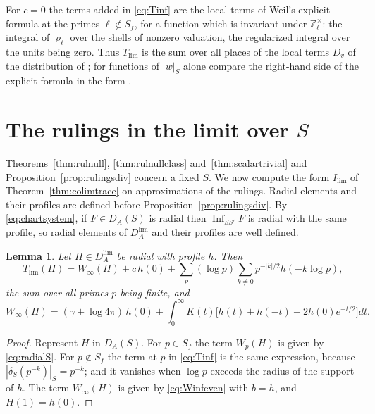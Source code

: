 \documentclass[11pt]{amsart}
\newtheorem{lemma}[theorem]{Lemma}
\theoremstyle{definition}
\theoremstyle{remark}
\newcommand{\Z}{\mathbb Z}
\newcommand{\Inf}{\operatorname{Inf}}
\newcommand{\DA}{D_A}
\begin{document}
For $c=0$ the terms added in \eqref{eq:Tinf} are the local terms of Weil's
explicit formula at the primes $\ell\notin S_f$, for a function which is
invariant under $\Z_{\ell}^{\times}$: the integral of $\varrho_{\ell}$ over
the shells of nonzero valuation, the regularized integral over the units
being zero.  Thus $T_{\lim}$ is the sum over all places of the local terms
$D_v$ of the distribution of \cite[Appendix~II, (5)--(8)]{Connes99}; for
functions of $|w|_S$ alone compare the right-hand side of the explicit
formula in the form \cite[(148)--(150)]{CCWeilArch}.

\appendix

\section{The rulings in the limit over \texorpdfstring{$S$}{S}}\label{app:mertens}

Theorems~\ref{thm:rulnull}, \ref{thm:rulnullclass} and~\ref{thm:scalartrivial}
and Proposition~\ref{prop:rulingsdiv} concern a fixed $S$.  We now compute the form $I_{\lim}$ of
Theorem~\ref{thm:colimtrace} on approximations of the rulings.  Radial
elements and their profiles are defined before
Proposition~\ref{prop:rulingsdiv}.  By \eqref{eq:chartsystem}, if
$F\in\DA(S)$ is radial then $\Inf_{SS'}F$ is radial with the same profile, so
radial elements of $\DA^{\lim}$ and their profiles are well defined.

\begin{lemma}\label{lem:radialtrace}
Let $H\in\DA^{\lim}$ be radial with profile $h$.  Then
\begin{equation}\label{eq:Wpprofile}
T_{\lim}(H)=W_{\infty}(H)+c\,h(0)+\sum_{p}(\log p)\sum_{k\ne0}p^{-|k|/2}
h(-k\log p),
\end{equation}
the sum over all primes $p$ being finite, and
\[
W_{\infty}(H)=(\gamma+\log4\pi)\,h(0)
+\int_0^{\infty}K(t)\bigl[h(t)+h(-t)-2h(0)e^{-t/2}\bigr]dt .
\]
\end{lemma}

\begin{proof}
Represent $H$ in $\DA(S)$.  For $p\in S_f$ the term $W_p(H)$ is given by
\eqref{eq:radialS}.  For $p\notin S_f$ the term at $p$ in \eqref{eq:Tinf} is
the same expression, because $|\delta_S(p^{-k})|_S=p^{-k}$; and it vanishes
when $\log p$ exceeds the radius of the support of $h$.  The term
$W_{\infty}(H)$ is given by \eqref{eq:Winfeven} with $b=h$, and $H(1)=h(0)$.
\end{proof}
\end{document}

